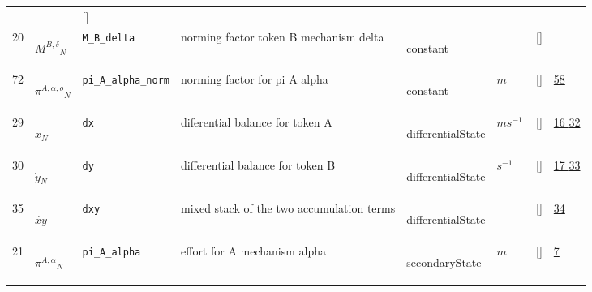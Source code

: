 \begin{longtable}{|p{1cm}|p{3cm}|p{3cm}|p{7cm}|p{3.0cm}|p{3cm}|p{2cm}|p{1cm}|}
             & $  $
             & []
             & \\
    20
             & \hypertarget{"v:20"}{ $ {{M^{B,\delta}}}{_{N}} $}
             & \verb|M_B_delta|
             & norming factor token B mechanism delta
             & \begin{lay}constant \end{lay}
             & $  $
             & []
             & \\
    72
             & \hypertarget{"v:72"}{ $ {{\pi^{A,\alpha,o}}}{_{N}} $}
             & \verb|pi_A_alpha_norm|
             & norming factor for pi A alpha
             & \begin{lay}constant \end{lay}
             & $ m  $
             & []
             & \hyperlink{"e:58"}{ 58 }
                 \\
    29
             & \hypertarget{"v:29"}{ $ {{\dot{x}}}{_{N}} $}
             & \verb|dx|
             & diferential balance for token A
             & \begin{lay}differentialState \end{lay}
             & $ m s^{-1} \, $
             & []
             & \hyperlink{"e:16"}{ 16 }
                 \hyperlink{"e:32"}{ 32 }
                 \\
    30
             & \hypertarget{"v:30"}{ $ {{\dot{y}}}{_{N}} $}
             & \verb|dy|
             & differential balance for token B
             & \begin{lay}differentialState \end{lay}
             & $ s^{-1} \, $
             & []
             & \hyperlink{"e:17"}{ 17 }
                 \hyperlink{"e:33"}{ 33 }
                 \\
    35
             & \hypertarget{"v:35"}{ $ {{\dot{xy}}}{_{}} $}
             & \verb|dxy|
             & mixed stack of the two accumulation terms
             & \begin{lay}differentialState \end{lay}
             & $  $
             & []
             & \hyperlink{"e:34"}{ 34 }
                 \\
    21
             & \hypertarget{"v:21"}{ $ {{\pi^{A,\alpha}}}{_{N}} $}
             & \verb|pi_A_alpha|
             & effort for A mechanism alpha
             & \begin{lay}secondaryState \end{lay}
             & $ m  $
             & []
             & \hyperlink{"e:7"}{ 7 }

\end{longtable}
